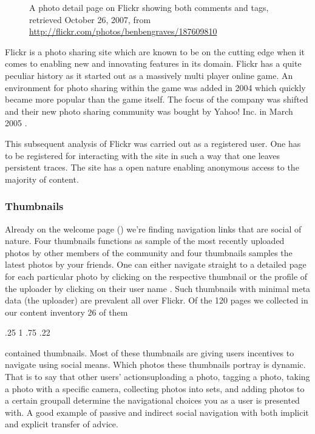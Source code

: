 \begin{figure}
\begin{whole}
\begin{minipage}[t]{0.475\wholewidth}
      \caption[Flickr Photo Detail Page]{%
         A photo detail page on Flickr showing both comments and tags,
         retrieved October 26, 2007, from
         \url{http://flickr.com/photos/benbengraves/187609810}}
      \label{figure:scrsh.flickr.photo.detail}
    \end{minipage}
  \end{whole}
  \normalcaption
\end{figure}

Flickr is a photo sharing site which are known to be on the cutting edge when
it comes to enabling new and innovating features in its domain. Flickr has a
quite peculiar history as it started out as a massively multi player online
game. An environment for photo sharing within the game was added in 2004 which
quickly became more popular than the game itself. The focus of the company was
shifted and their new photo sharing community was bought by Yahoo! Inc. in
March 2005 \citep[]{livingston07}.

This subsequent
analysis of Flickr was carried out as a registered user. One has to be
registered for interacting with the site in such a way that one leaves
persistent traces. The site has a open nature enabling anonymous access
to the majority of content.

\subsubsection{Thumbnails}

Already on the welcome page ()
we're finding navigation links that are social of
nature. Four thumbnails functions as sample of the most recently uploaded
photos by other members of the community and four thumbnails samples the
latest photos by your friends.
One can either navigate straight to
a detailed page for each particular photo by clicking on the respective
thumbnail 
or the profile of the uploader by clicking on their user
name . Such thumbnails
with minimal meta data (the uploader) are prevalent all over Flickr. Of the
120 pages we collected in our content inventory 26 of them
\begin{sparkline}{3}
  \sparkspike .25  1
  \sparkspike .75  .22
\end{sparkline}
contained thumbnails. Most of these thumbnails
are giving users incentives to navigate using social means.%
Which photos these thumbnails portray is dynamic. That is to say that other
users' actions\dash{}uploading a photo, tagging a photo, taking a photo with a
specific camera, collecting photos into sets, and adding photos to a certain
group\dash{}all determine the navigational choices you as a user is
presented with. A good example of passive and indirect social navigation
with both implicit and explicit transfer of advice.

